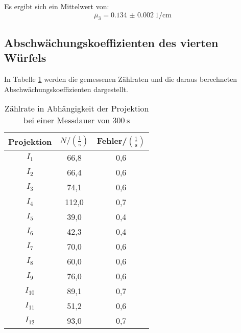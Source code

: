 Es ergibt sich ein Mittelwert von:
\begin{equation*}
  \bar\mu_3 = \SI{0.134(2)}{1\per\centi\meter}
\end{equation*}


\subsection{Abschwächungskoeffizienten des vierten Würfels}
In Tabelle \ref{tab:mu} werden die gemessenen Zählraten und
die daraus berechneten Abschwächungskoeffizienten dargestellt.

\begin{table}[H]
  \centering
  \caption{Zählrate in Abhängigkeit der Projektion bei einer Messdauer von $\SI{300}{\second}$}
  \label{tab:mu}
  \begin{tabular}{c c c}
    \toprule
    Projektion & $N/ \left(\mathrm{\frac{1}{s}}\right)$ & Fehler/$\left(\mathrm{\frac{1}{s}}\right)$   \\
    \midrule
        $I_1$    & 66,8  & 0,6    \\
        $I_2$    & 66,4  & 0,6    \\
        $I_3$    & 74,1  & 0,6    \\
        $I_4$    & 112,0 & 0,7    \\
        $I_5$    & 39,0  & 0,4    \\
        $I_6$    & 42,3  & 0,4    \\
        $I_7$    & 70,0  & 0,6    \\
        $I_8$    & 60,0  & 0,6    \\
        $I_9$    & 76,0  & 0,6    \\
        $I_{10}$ & 89,1  & 0,7   \\
        $I_{11}$ & 51,2  & 0,6    \\
        $I_{12}$ & 93,0  & 0,7    \\
    \bottomrule
  \end{tabular}
\end{table}

